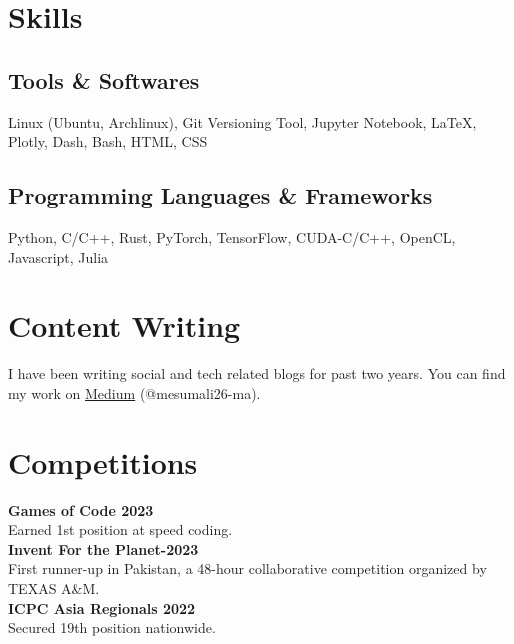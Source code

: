 \documentclass[]{resume}
\begin{document}
\begin{minipage}[t]{0.5\textwidth}


    \section{Skills}

    \subsection{Tools \& Softwares}
    Linux (Ubuntu, Archlinux), Git Versioning Tool, Jupyter Notebook, \LaTeX, Plotly, Dash, Bash, HTML, CSS

    \subsection{Programming Languages \& Frameworks}
    Python, C/C++, Rust, PyTorch, TensorFlow, CUDA-C/C++, OpenCL, Javascript, Julia


    \section{Content Writing}
    I have been writing social and tech related blogs for past two years. You can find my work on \href{https://medium.com/@mesumali26-ma}{Medium} (@mesumali26-ma).

    \section{Competitions}
    \textbf{Games of Code 2023}\\
    Earned 1st position at speed coding.\\
    \textbf{Invent For the Planet-2023}\\
    First runner-up in Pakistan, a 48-hour collaborative competition organized by TEXAS A\&M.\\
    \textbf{ICPC Asia Regionals 2022}\\
    Secured 19th position nationwide.


\end{minipage}
\end{document}
